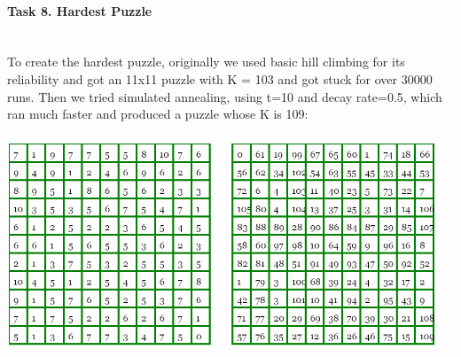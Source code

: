 \documentclass[12pt, letterpaper]{article}
\begin{document}
\pagebreak
\paragraph{Task 8. Hardest Puzzle} \mbox{}\\

To create the hardest puzzle, originally we used basic hill climbing for its reliability and got an 11x11 puzzle with K = 103 and got stuck for over 30000 runs. Then we tried simulated annealing, using t=10 and decay rate=0.5, which ran much faster and produced a puzzle whose K is 109:

\includegraphics[width=\linewidth]{"Task 8/Hardest Puzzle"}
\end{document}
